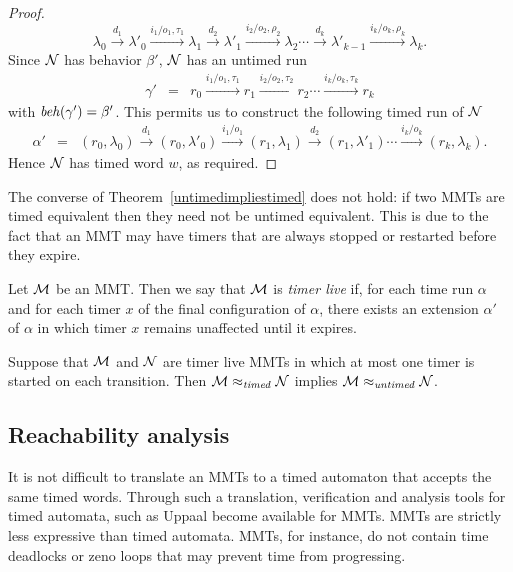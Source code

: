 \begin{proof}
\[
\lambda_0 \xrightarrow{d_1} \lambda'_0 \xrightarrow{i_1/o_1, \tau_1} \lambda_1 \xrightarrow{d_2} \lambda'_1 \xrightarrow{i_2/o_2, \rho_2} \lambda_2 \cdots
\xrightarrow{d_k} \lambda'_{k-1} \xrightarrow{i_k/o_k, \rho_k} \lambda_{k}.
\]
Since ${\cal N}$ has behavior $\beta'$, ${\cal N}$ has an untimed run
\begin{eqnarray*}
\gamma' & = & r_0 \xrightarrow{i_1/o_1, \tau_1} r_1  \xrightarrow{i_2/o_2, \tau_2} r_2 \cdots \xrightarrow{i_k/o_k, \tau_k} r_k
\end{eqnarray*}
with $\mathit{beh}(\gamma') = \beta'$.
This permits us to construct the following timed run of ${\cal N}$ 
\begin{eqnarray*}
\alpha' & = & (r_0, \lambda_0) \xrightarrow{d_1} (r_0, \lambda'_0) \xrightarrow{i_1/o_1} (r_1, \lambda_1) \xrightarrow{d_2} (r_1, \lambda'_1)  \cdots
 \xrightarrow{i_k/o_k} (r_k, \lambda_k).
\end{eqnarray*}
Hence ${\cal N}$ has timed word $w$, as required.
\end{proof}

The converse of Theorem~\ref{untimedimpliestimed} does not hold: if two MMTs are timed equivalent then they need not
be untimed equivalent. This is due to the fact that an MMT may have timers that are always stopped or restarted before
they expire.

Let ${\cal M}$ be an MMT. Then we say that ${\cal M}$ is \emph{timer live} if, for each time run $\alpha$ and for each timer $x$
of the final configuration of $\alpha$, there exists an extension $\alpha'$ of $\alpha$ in which timer $x$ 
remains unaffected until it expires.

\begin{theorem}
\label{timedimpliesuntimed}
Suppose that ${\cal M}$ and ${\cal N}$ are timer live MMTs in which at most one timer is started on each transition. Then
${\cal M} \approx_{\mathit{timed}} {\cal N}$
implies
${\cal M} \approx_{\mathit{untimed}} {\cal N}$.
\end{theorem}

\subsection{Reachability analysis}
It is not difficult to translate an MMTs to a timed automaton \cite{AD94,BengtssonY03} that accepts the same timed words.
Through such a translation, verification and analysis tools for timed automata, such as Uppaal \cite{Uppaal4.0}
become available for MMTs.
MMTs are strictly less expressive than timed automata. MMTs, for instance, do not contain time deadlocks or zeno loops that
may prevent time from progressing.

